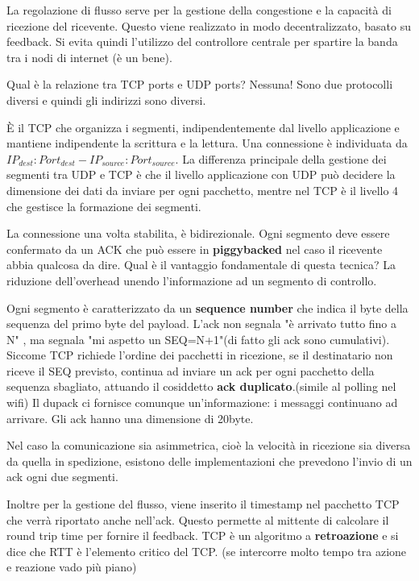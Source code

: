 \documentclass{article}
\begin{document}
\noindent La regolazione di flusso serve per la gestione della congestione e la capacità di ricezione del ricevente. Questo viene realizzato in modo decentralizzato,
 basato su feedback. Si evita quindi l'utilizzo del controllore centrale per spartire la banda tra i nodi di internet (è un bene).
\medskip

\noindent Qual è la relazione tra TCP ports e UDP ports? Nessuna! Sono due protocolli diversi e quindi gli indirizzi sono diversi.
\medskip

\noindent È il TCP che organizza i segmenti, indipendentemente dal livello applicazione e mantiene indipendente la scrittura e la lettura.
Una connessione è individuata da $IP_{dest}:Port_{dest}-IP_{source}:Port_{source}$. La differenza principale della gestione dei segmenti 
tra UDP e TCP è che il livello applicazione con UDP può decidere la dimensione dei dati da inviare per ogni pacchetto, mentre nel TCP 
è il livello 4 che gestisce la formazione dei segmenti.

\noindent La connessione una volta stabilita, è bidirezionale. Ogni segmento deve essere confermato da un ACK che può essere in \textbf{piggybacked} nel caso il ricevente abbia qualcosa 
da dire. Qual è il vantaggio fondamentale di questa tecnica? La riduzione dell'overhead unendo l'informazione ad un segmento di controllo.

\noindent Ogni segmento è caratterizzato da un \textbf{sequence number} che indica il byte della sequenza del primo byte del payload.
L'ack non segnala "è arrivato tutto fino a N" , ma segnala "mi aspetto un SEQ=N+1"(di fatto gli ack sono cumulativi).
Siccome TCP richiede l'ordine dei pacchetti in ricezione, se il destinatario non riceve il SEQ previsto, continua ad inviare un ack
 per ogni pacchetto della sequenza sbagliato, attuando il cosiddetto \textbf{ack duplicato}.(simile al polling nel wifi)
 Il dupack ci fornisce comunque un'informazione: i messaggi continuano ad arrivare. Gli ack hanno una dimensione di 20byte.

 \noindent Nel caso la comunicazione sia asimmetrica, cioè la velocità in ricezione sia diversa da quella in spedizione, esistono
 delle implementazioni che prevedono l'invio di un ack ogni due segmenti.
 \medskip

\noindent Inoltre per la gestione del flusso, viene inserito il timestamp nel pacchetto TCP che verrà riportato anche nell'ack. Questo
 permette al mittente di calcolare il round trip time per fornire il feedback. TCP è un algoritmo 
 a \textbf{retroazione} e si dice che RTT è l'elemento critico del TCP. (se intercorre molto tempo tra azione e reazione vado più piano)
 
\end{document}
